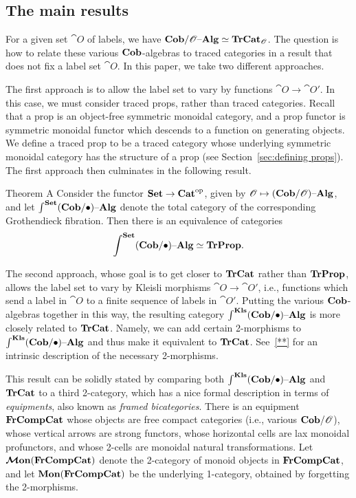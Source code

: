 \documentclass[12pt,oneside,article,draft]{memoir}
\begin{document}
\subsection{The main results}

For a given set $\cat{O}$ of labels, we have $\mathbf{Cob}/\mathscr{O}{\text \textendash}\mathbf{Alg}\simeq\mathbf{TrCat}_{\mathscr{O}}$.
The question is how to relate these various $\mathbf{Cob}$-algebras to traced categories in a result that does not fix a label set $\cat{O}$.
In this paper, we take two different approaches.

The first approach is to allow the label set to vary by functions $\cat{O}\to\cat{O'}$.
In this case, we must consider traced props, rather than traced categories.
Recall that a prop is an object-free symmetric monoidal category, and a prop functor is symmetric monoidal functor which descends to a function on generating objects.
We define a traced prop to be a traced category whose underlying symmetric monoidal category has the structure of a prop (see Section~\ref{sec:defining props}).
The first approach then culminates in the following result.

\begin{named}{Theorem A}
   Consider the functor $\mathbf{Set}\to{\mathbf{Cat}}^{\text{op}}$, given by $\mathscr{O}\mapsto(\mathbf{Cob}/\mathscr{O}){\text \textendash}\mathbf{Alg}$, and let $\int^{\mathbf{Set}}(\mathbf{Cob}/\bullet){\text \textendash}\mathbf{Alg}$ denote the total category of the corresponding Grothendieck fibration.
   Then there is an equivalence of categories
   $$\int^{\mathbf{Set}}(\mathbf{Cob}/\bullet){\text \textendash}\mathbf{Alg}\simeq\mathbf{TrProp}.$$
\end{named}

The second approach, whose goal is to get closer to $\mathbf{TrCat}$ rather than $\mathbf{TrProp}$, allows the label set to vary by Kleisli morphisms $\cat{O}\to\cat{O'}$, i.e., functions which send a label in $\cat{O}$ to a finite sequence of labels in $\cat{O'}$.
Putting the various $\mathbf{Cob}$-algebras together in this way, the resulting category $\int^{\mathbf{Kls}}(\mathbf{Cob}/\bullet){\text \textendash}\mathbf{Alg}$ is more closely related to $\mathbf{TrCat}$.
Namely, we can add certain 2-morphisms to $\int^{\mathbf{Kls}}(\mathbf{Cob}/\bullet){\text \textendash}\mathbf{Alg}$ and thus make it equivalent to $\mathbf{TrCat}$.
See~\ref{**} for an intrinsic description of the necessary 2-morphisms.

This result can be solidly stated by comparing both $\int^{\mathbf{Kls}}(\mathbf{Cob}/\bullet){\text \textendash}\mathbf{Alg}$ and $\mathbf{TrCat}$ to a third 2-category, which has a nice formal description in terms of \emph{equipments}, also known as \emph{framed bicategories}.
There is an equipment $\mathbf{FrCompCat}$ whose objects are free compact categories (i.e., various $\mathbf{Cob}/\mathscr{O}$), whose vertical arrows are strong functors, whose horizontal cells are lax monoidal profunctors, and whose 2-cells are monoidal natural transformations.
Let $\bm{\mathcal{M}}\mathbf{on}(\mathbf{FrCompCat})$ denote the 2-category of monoid objects in $\mathbf{FrCompCat}$, and let $\mathbf{Mon}(\mathbf{FrCompCat})$ be the underlying 1-category, obtained by forgetting the 2-morphisms.
\end{document}
